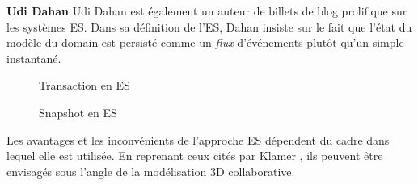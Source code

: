 \textbf{Udi Dahan} Udi Dahan est également un auteur de billets de blog 
prolifique sur les systèmes \gls{ES}. Dans sa définition de l'\gls{ES}, Dahan 
insiste sur le fait que \og l'état du modèle du domain est persisté comme un 
\textit{flux} d'événements plutôt qu'un simple instantané\fg{}.


%
	\begin{figure}[!h]
		
		\centering
		\noindent
	
		\caption{Transaction en \gls{ES}}
		\label{fig:es-transaction}
	\end{figure}

	
	\begin{figure}[t]
		\centering
		
		\caption{Snapshot en \gls{ES}}
	\end{figure}

Les avantages et les inconvénients de l'approche \gls{ES} dépendent du
cadre dans lequel elle est utilisée. En reprenant ceux cités par Klamer 
\cite{Klamer2013a}, ils peuvent être envisagés sous l'angle de la modélisation 3D 
collaborative.

